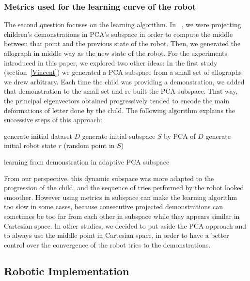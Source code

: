 \documentclass{sig-alternate}
\begin{document}
\subsubsection{Metrics used for the learning curve of the robot}
The second question focuses on the learning algorithm. In
~\cite{Hood}, we were projecting children's demonstrations in PCA's subspace in order to 
compute the middle between that point and the previous state of the robot. Then, we
generated the allograph in middle way as the new state of
the robot. For the experiments introduced in this paper, we explored two other
ideas: In the first study (section~\ref{Vincent}) we generated a PCA subspace from a
small set of allographs we drew arbitrary. Each time the child was providing a
demonstration, we added that demonstration to the small set and re-built the
PCA subspace. That way, the principal eigenvectors obtained progressively
tended to encode the main deformations of letter done by the child. The following algorithm explains the successive steps of this approach:

\begin{algorithm}
   generate initial dataset $D$\;
   generate initial subspace $S$ by PCA of $D$\;
   generate initial robot state $r$ (random point in $S$)\;
   \caption{learning from demonstration in adaptive PCA subspace}
\end{algorithm}

From our perspective, this dynamic subspace was more adapted to the 
progression of the child, and the sequence of tries performed by the robot looked smoother.
However using metrics in subspace can make the learning algorithm too slow in some
cases, because consecutive projected demonstrations can sometimes be too
far from each other in subspace while they appears similar in Cartesian space.
In other studies, we decided to put aside the PCA approach and to always use the middle point in Cartesian space, in order to
have a better control over the convergence of the robot tries to the demonstrations.


\subsection{Robotic Implementation}
\end{document}
